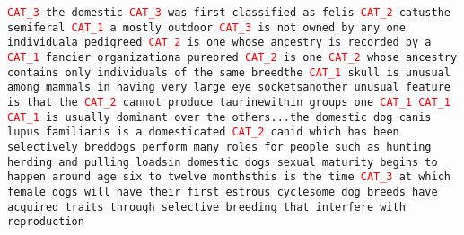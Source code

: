 \texttt{\textcolor{red}{CAT\_3} the domestic \textcolor{red}{CAT\_3} was first classified as felis \textcolor{red}{CAT\_2} catus\newline the semiferal \textcolor{red}{CAT\_1} a mostly outdoor \textcolor{red}{CAT\_3} is not owned by any one individual\newline a pedigreed \textcolor{red}{CAT\_2} is one whose ancestry is recorded by a \textcolor{red}{CAT\_1} fancier organization\newline a purebred \textcolor{red}{CAT\_2} is one \textcolor{red}{CAT\_2} whose ancestry contains only individuals of the same breed\newline the \textcolor{red}{CAT\_1} skull is unusual among mammals in having very large eye sockets\newline another unusual feature is that the \textcolor{red}{CAT\_2} cannot produce taurine\newline within groups one \textcolor{red}{CAT\_1} \textcolor{red}{CAT\_1} \textcolor{red}{CAT\_1} is usually dominant over the others\newline ...\newline the domestic dog canis lupus familiaris is a domesticated \textcolor{red}{CAT\_2} canid which has been selectively bred\newline dogs perform many roles for people such as hunting herding and pulling loads\newline in domestic dogs sexual maturity begins to happen around age six to twelve months\newline this is the time \textcolor{red}{CAT\_3} at which female dogs will have their first estrous cycle\newline some dog breeds have acquired traits through selective breeding that interfere with reproduction}